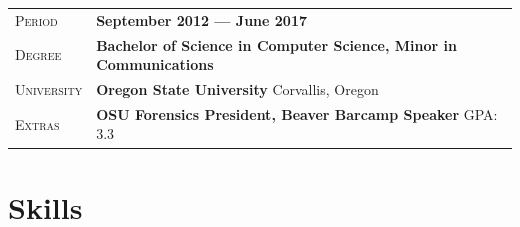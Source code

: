 \documentclass[a4paper, oneside, final]{scrartcl} %
\newcommand{\gray}{\rowcolor[gray]{.90}} %
\begin{document}
\begin{center}
\begin{tabularx}{0.97\linewidth}{>{\raggedleft\scshape}p{2cm}X}
\gray Period & \textbf{September 2012 --- June 2017}\\
\gray Degree & \textbf{Bachelor of Science in Computer Science, Minor in Communications}\\
\gray University & \textbf{Oregon State University} \hfill Corvallis, Oregon\\
\gray Extras & \textbf{OSU Forensics President, Beaver Barcamp Speaker} \hfill GPA: 3.3\\
\end{tabularx}


\section{Skills}


\end{center}
\end{document}
